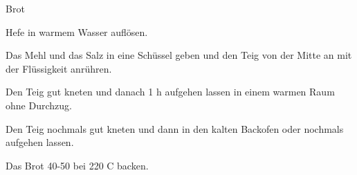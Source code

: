
\begin{recipe}[]{Brot}{}{}



\step
Hefe in warmem Wasser aufl\"osen.

\step
Das Mehl und das Salz in eine Sch\"ussel geben und den Teig von der Mitte an mit der Fl\"ussigkeit anr\"uhren.

\step
Den Teig gut kneten und danach 1 h aufgehen lassen in einem warmen Raum ohne Durchzug.

\step
Den Teig nochmals gut kneten und dann in den kalten Backofen oder nochmals aufgehen lassen.

\step
Das Brot 40-50 \min bei 220 C backen.


\end{recipe}